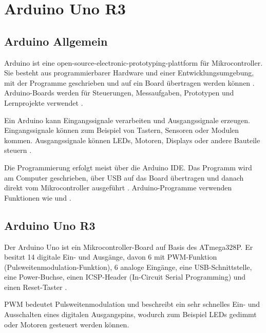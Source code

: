 %
%

\chapter{Arduino Uno R3}

\section{Arduino Allgemein}

Arduino ist eine open-source-electronic-prototyping-plattform für Mikrocontroller. Sie besteht aus programmierbarer Hardware und einer Entwicklungsumgebung, mit der Programme geschrieben und auf ein Board übertragen werden können \cite{arduino:language-reference}. Arduino-Boards werden für Steuerungen, Messaufgaben, Prototypen und Lernprojekte verwendet \cite{arduino:uno-r3}.

Ein Arduino kann Eingangssignale verarbeiten und Ausgangssignale erzeugen. Eingangssignale können zum Beispiel von Tastern, Sensoren oder Modulen kommen. Ausgangssignale können LEDs, Motoren, Displays oder andere Bauteile steuern \cite{arduino:uno-components}.

Die Programmierung erfolgt meist über die Arduino IDE. Das Programm wird am Computer geschrieben, über USB auf das Board übertragen und danach direkt vom Mikrocontroller ausgeführt \cite{arduino:uno-components}. Arduino-Programme verwenden Funktionen wie  und  \cite{arduino:language-reference}.

\section{Arduino Uno R3}

Der Arduino Uno ist ein Mikrocontroller-Board auf Basis des ATmega328P. Er besitzt 14 digitale Ein- und Ausgänge, davon 6 mit PWM-Funktion (Pulsweitenmodulation-Funktion), 6 analoge Eingänge, eine USB-Schnittstelle, eine Power-Buchse, einen ICSP-Header (In-Circuit Serial Programming) und einen Reset-Taster \cite{arduino:uno-r3}\cite{arduino:uno-datasheet}.

PWM bedeutet Pulsweitenmodulation und beschreibt ein sehr schnelles Ein- und Ausschalten eines digitalen Ausgangspins, wodurch zum Beispiel LEDs gedimmt oder Motoren gesteuert werden können.

